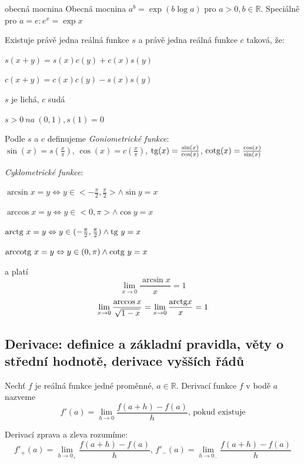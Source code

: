 \begin{definiceN}{obecná mocnina}
Obecná mocnina $a^b=\exp(b \log a)$ pro $a>0, b \in \mathbb{R}$. Speciálně pro $a=e: e^x=\exp x$
\end{definiceN}

\begin{veta}
Existuje právě jedna reálná funkce $s$ a právě jedna reálná funkce $c$ taková, že:

\begin{pitemize}
	\item $s(x+y) = s(x)c(y) + c(x)s(y)$
	\item $c(x+y) = c(x)c(y) - s(x)s(y)$
	\item $s$ je lichá, $c$ sudá
	\item $s>0~\textit{na}~(0,1), s(1)=0$
\end{pitemize}
\end{veta}

\begin{definice}
\noindent Podle $s$ a $c$ definujeme \emph{Goniometrické funkce}:\\
$\sin(x)=s(\frac{x}{\pi})$, $\cos(x)=c(\frac{x}{\pi})$, $\mathrm{tg}(x)=\frac{\sin(x)}{\cos(x)}$, $\mathrm{cotg}(x)=\frac{\cos(x)}{\sin(x)}$

\noindent \emph{Cyklometrické funkce}:
\begin{pitemize}
	\item $\arcsin x = y \Leftrightarrow y \in <-\frac{\pi}{2}, \frac{\pi}{2}> \wedge \sin y=x$
	\item $\arccos x = y \Leftrightarrow y \in <0, \pi> \wedge \cos y=x$
	\item $\mathrm{arctg}~x = y \Leftrightarrow y \in (-\frac{\pi}{2}, \frac{\pi}{2}) \wedge \mathrm{tg}~y=x$
	\item $\mathrm{arccotg}~x = y \Leftrightarrow y \in (0, \pi) \wedge \mathrm{cotg}~y=x$
\end{pitemize}

\noindent a platí
$$\lim_{x \rightarrow 0} \frac{\arcsin x}{x} = 1$$
$$\lim_{x \rightarrow 0} \frac{\arccos x}{\sqrt{1-x}} = \lim_{x \rightarrow 0} \frac{\mathrm{arctg} x}{x} = 1$$
\end{definice}

\subsection{Derivace: definice a základní pravidla, věty o střední hodnotě, derivace vyšších řádů}
\begin{definice}
Nechť $f$ je reálná funkce jedné proměnné, $a \in \mathbb{R}$. Derivací funkce $f$ v bodě $a$ nazveme
$$f'(a) = \lim_{h \rightarrow 0} \frac{f(a+h)-f(a)}{h} \textrm{, pokud existuje}$$

\noindent Derivací zprava a zleva rozumíme:
$$f'_{+}(a) = \lim_{h \rightarrow 0_+} \frac{f(a+h)-f(a)}{h}, \, f'_{-}(a) = \lim_{h \rightarrow 0_-} \frac{f(a+h)-f(a)}{h}$$
\end{definice}

